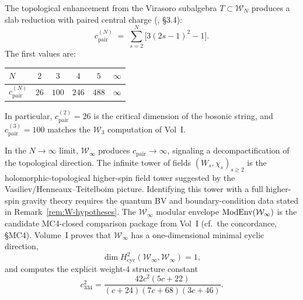 \begin{proposition}
The topological enhancement from the Virasoro subalgebra $T \subset
\mathcal{W}_N$ produces a slab reduction with paired central charge
\textup{(}\!\cite{KZ25}, \S3.4\textup{)}:
\begin{equation}%
c_{\mathrm{pair}}^{(N)}
\;=\;
\sum_{s=2}^{N} \bigl[3(2s-1)^2 - 1\bigr].
\end{equation}
The first values are:
\begin{center}
\renewcommand{\arraystretch}{1.2}
\begin{tabular}{lccccc}
\toprule
$N$ & $2$ & $3$ & $4$ & $5$ & $\infty$ \\
\midrule
$c_{\mathrm{pair}}^{(N)}$ & $26$ & $100$ & $246$ & $488$ & $\infty$ \\
\bottomrule
\end{tabular}
\end{center}
In particular, $c_{\mathrm{pair}}^{(2)} = 26$ is the critical dimension of
the bosonic string, and $c_{\mathrm{pair}}^{(3)} = 100$ matches the
$\mathcal{W}_3$ computation of Vol~I.
\end{proposition}

\begin{remark}
In the $N \to \infty$ limit, $\mathcal{W}_\infty$ produces
$c_{\mathrm{pair}} \to \infty$, signaling a decompactification of the
topological direction. The infinite tower of fields
$(W_s, \chi_s)_{s \geq 2}$ is the holomorphic-topological higher-spin
field tower suggested by the Vasiliev/Henneaux--Teitelboim picture.
Identifying this tower with a full higher-spin gravity theory requires
the quantum BV and boundary-condition data stated in
Remark~\ref{rem:W-hypotheses}. The $\mathcal{W}_\infty$ modular
envelope $\operatorname{ModEnv}(\mathcal{W}_\infty)$ is the candidate MC4-closed
comparison package from Vol~I
\textup{(}cf.~the concordance, \S\textup{MC4}\textup{)}.
Volume~I proves that $\mathcal{W}_\infty$ has a one-dimensional
minimal cyclic direction,
\[
\dim H^2_{\mathrm{cyc}}(\mathcal{W}_\infty, \mathcal{W}_\infty)=1,
\]
and computes the explicit weight-$4$ structure constant
\[
c_{334}^2=\frac{42c^2(5c+22)}{(c+24)(7c+68)(3c+46)}.
\]
\end{remark}


